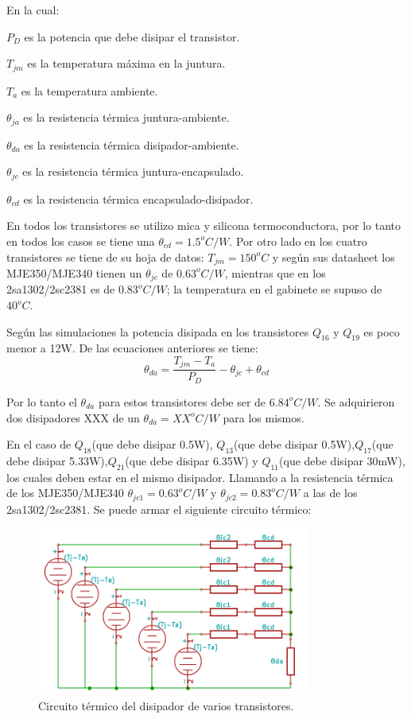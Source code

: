 En la cual:
\begin{list}{ }
\item $P_D$  es la potencia que debe disipar el transistor.
\item $T_{jm}$ es la temperatura máxima en la juntura.
\item  $T_a$ es la temperatura ambiente.
\item  $\theta_{ja}$ es la resistencia térmica juntura-ambiente.
\item  $\theta_{da}$ es la resistencia térmica disipador-ambiente.
\item  $\theta_{jc}$ es la resistencia térmica juntura-encapsulado.
\item  $\theta_{cd}$ es la resistencia térmica encapsulado-disipador.
\end{list}
En todos los transistores se utilizo mica y silicona termoconductora, por lo tanto en todos los casos se tiene una $\theta_{cd}=1.5^oC/W$.
Por otro lado en los cuatro transistores se tiene de su hoja de datos: $T_{jm}=150^oC$ y según sus datasheet los MJE350/MJE340 tienen un $\theta_{jc}$ de $0.63^oC/W$, mientras que en los 2sa1302/2sc2381 es de $0.83^oC/W$; la temperatura en el gabinete se supuso de $40^oC$.

Según las simulaciones la potencia disipada en los transistores $Q_{16}$ y $Q_{19}$ es poco menor a 12W. De las ecuaciones anteriores se tiene:
$$
	\theta_{da}=\dfrac{T_{jm}-T_a}{P_D} - \theta_{jc}+\theta_{cd}
$$

Por lo tanto el $\theta_{da}$ para estos transistores debe ser de $6.84^oC/W$. Se adquirieron dos disipadores XXX de un  $\theta_{da}=XX^oC/W$ para los mismos.

En el caso de $Q_{18}$(que debe disipar 0.5W), $Q_{13}$(que debe disipar 0.5W),$Q_{17}$(que debe disipar 5.33W),$Q_{21}$(que debe disipar 6.35W) y $Q_{11}$(que debe disipar 30mW), los cuales deben estar en el mismo disipador.
Llamando a la resistencia térmica de los MJE350/MJE340 $\theta_{jc1}=0.63^oC/W$ y $\theta_{jc2}=0.83^oC/W$ a las de los 2sa1302/2sc2381. Se puede armar el siguiente circuito térmico:

\begin{figure}[H]
\centerline{
\includegraphics[width=0.8\textwidth]{img/disipador_cir.png}}
\caption{Circuito térmico del disipador de varios transistores.}
\end{figure}

